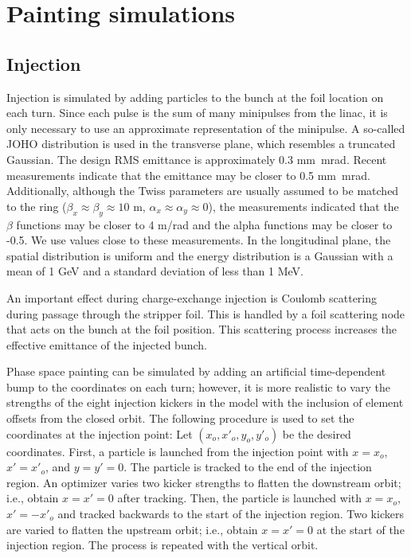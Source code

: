 \section{Painting simulations}

\subsection{Injection}

Injection is simulated by adding particles to the bunch at the foil location on each turn. Since each pulse is the sum of many minipulses from the linac, it is only necessary to use an approximate representation of the minipulse. A so-called JOHO distribution is used in the transverse plane, which resembles a truncated Gaussian. The design RMS emittance is approximately 0.3 mm~mrad. Recent measurements indicate that the emittance may be closer to 0.5 mm~mrad. Additionally, although the Twiss parameters are usually assumed to be matched to the ring ($\beta_x \approx \beta_y \approx 10$ m, $\alpha_x \approx \alpha_y \approx 0$), the measurements indicated that the $\beta$ functions may be closer to 4 m/rad and the alpha functions may be closer to -0.5. We use values close to these measurements. In the longitudinal plane, the spatial distribution is uniform and the energy distribution is a Gaussian with a mean of 1 GeV and a standard deviation of less than 1 MeV.

An important effect during charge-exchange injection is Coulomb scattering during passage through the stripper foil. This is handled by a foil scattering node that acts on the bunch at the foil position. This scattering process increases the effective emittance of the injected bunch.

Phase space painting can be simulated by adding an artificial time-dependent bump to the coordinates on each turn; however, it is more realistic to vary the strengths of the eight injection kickers in the model with the inclusion of element offsets from the closed orbit. The following procedure is used to set the coordinates at the injection point: Let $(x_o, x'_o, y_o, y'_o)$ be the desired coordinates. First, a particle is launched from the injection point with $x = x_o$, $x' = x'_o$, and $y = y' = 0$. The particle is tracked to the end of the injection region. An optimizer varies two kicker strengths to flatten the downstream orbit; i.e., obtain $x = x' = 0$ after tracking. Then, the particle is launched with $x = x_o$, $x' = -x'_o$ and tracked backwards to the start of the injection region. Two kickers are varied to flatten the upstream orbit; i.e., obtain $x = x' = 0$ at the start of the injection region. The process is repeated with the vertical orbit.


